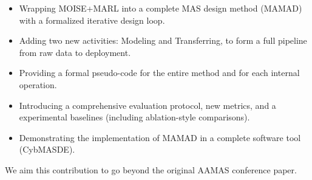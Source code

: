 \documentclass[11pt]{article}
\begin{document}
\begin{itemize}[noitemsep, topsep=2pt]
    \item Wrapping MOISE+MARL into a complete MAS design method (MAMAD) with a formalized iterative design loop.
    \item Adding two new activities: Modeling and Transferring, to form a full pipeline from raw data to deployment.
    \item Providing a formal pseudo-code for the entire method and for each internal operation.
    \item Introducing a comprehensive evaluation protocol, new metrics, and a experimental baselines (including ablation-style comparisons).
    \item Demonstrating the implementation of MAMAD in a complete software tool (CybMASDE).
\end{itemize}

\noindent We aim this contribution to go beyond the original AAMAS conference paper.

\setlength{\bibsep}{4pt}


\end{document}
